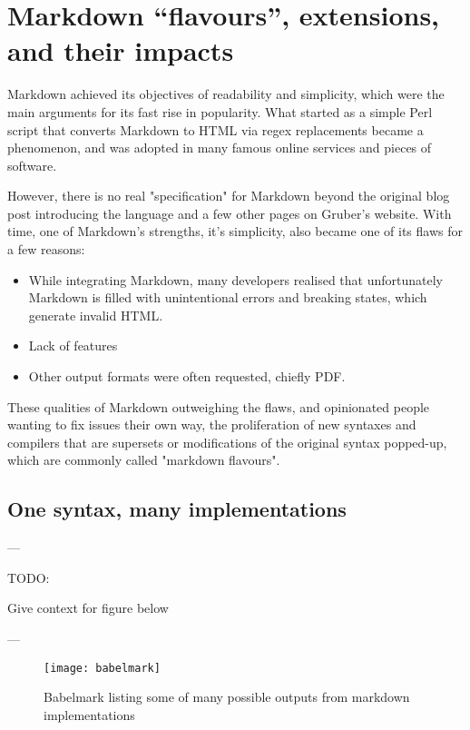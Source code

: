 \chapter{Markdown ``flavours'', extensions, and their impacts}

\vspace{1cm}

Markdown achieved its objectives of readability and simplicity, which were the main arguments for its fast rise in popularity.
What started as a simple Perl script that converts Markdown to HTML via regex replacements became a phenomenon, and was adopted in many
famous online services and pieces of software.\newline

However, there is no real "specification" for Markdown beyond the original blog post introducing the language and a few other pages
on Gruber's website. With time, one of Markdown's strengths, it's simplicity, also became one of its flaws for a few reasons:

\begin{itemize}
    \item While integrating Markdown, many developers realised that unfortunately Markdown is filled with unintentional errors and breaking states, which generate invalid HTML.
    \item Lack of features
    \item Other output formats were often requested, chiefly PDF.
\end{itemize}

These qualities of Markdown outweighing the flaws, and opinionated people wanting to fix issues their own way, the proliferation of new syntaxes
and compilers that are supersets or modifications of the original syntax popped-up, which are commonly called "markdown flavours".

\section{One syntax, many implementations}

---

TODO:

Give context for figure below

---

\begin{figure}[h]
\centering
\texttt{[image: babelmark]}
\caption{Babelmark listing some of many possible outputs from markdown implementations}
\end{figure}

